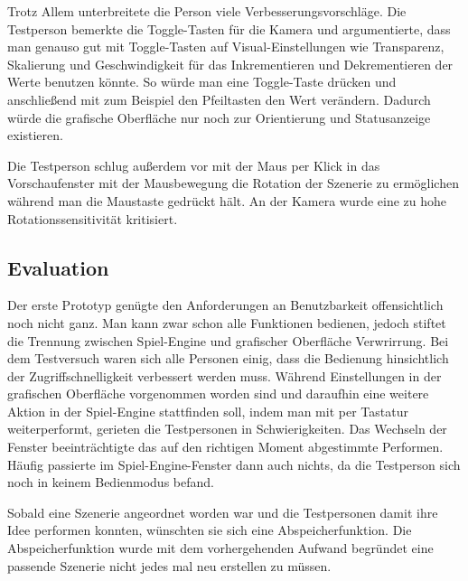 Trotz Allem unterbreitete die Person viele Verbesserungsvorschl\"age. Die Testperson bemerkte die Toggle-Tasten f\"ur die
Kamera und argumentierte, dass man genauso gut mit Toggle-Tasten auf Visual-Einstellungen wie Transparenz, Skalierung
und Geschwindigkeit f\"ur das Inkrementieren und Dekrementieren der Werte benutzen k\"onnte. So w\"urde man eine
Toggle-Taste dr\"ucken und anschlie\ss{}end mit zum Beispiel den Pfeiltasten den Wert ver\"andern. Dadurch w\"urde
die grafische Oberfl\"ache nur noch zur Orientierung und Statusanzeige existieren.


Die Testperson schlug au\ss{}erdem vor mit der Maus per Klick in das Vorschaufenster mit der Mausbewegung die Rotation
der Szenerie zu erm\"oglichen w\"ahrend man die Maustaste gedr\"uckt h\"alt.
An der Kamera wurde eine zu hohe Rotationssensitivit\"at kritisiert.


\subsection{Evaluation}

Der erste Prototyp gen\"ugte den Anforderungen an Benutzbarkeit offensichtlich noch nicht ganz. Man kann zwar schon alle
Funktionen bedienen, jedoch stiftet die Trennung zwischen Spiel-Engine und grafischer Oberfl\"ache Verwrirrung.
Bei dem Testversuch waren sich alle Personen einig, dass die Bedienung hinsichtlich der Zugriffschnelligkeit verbessert werden
muss. W\"ahrend Einstellungen in der grafischen Oberfl\"ache vorgenommen worden sind und daraufhin eine weitere Aktion
in der Spiel-Engine stattfinden soll, indem man mit per Tastatur weiterperformt, gerieten die Testpersonen in Schwierigkeiten.
Das Wechseln der Fenster beeintr\"achtigte das auf den richtigen Moment abgestimmte Performen. H\"aufig passierte
im Spiel-Engine-Fenster dann auch nichts, da die Testperson sich noch in keinem Bedienmodus befand.

Sobald eine Szenerie angeordnet worden war und die Testpersonen damit ihre Idee performen konnten, w\"unschten sie sich
eine Abspeicherfunktion. Die Abspeicherfunktion wurde mit dem vorhergehenden Aufwand begr\"undet eine passende Szenerie
nicht jedes mal neu erstellen zu m\"ussen.

